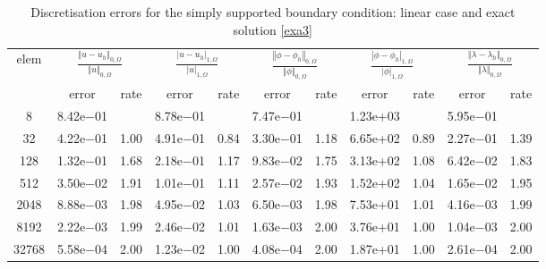\documentclass[a4paper,final]{siamltex}
\begin{document}
\begin{table}[htb!]
	\centering
	\caption{Discretisation errors  for the simply supported boundary condition: linear case and exact solution \eqref{exa3}}
	\begin{tabular}{|c|cc|cc|cc|cc|cc|}
		\hline
				\multirow{2}{*}{elem} & \multicolumn{2}{c|}{$\frac{\left\Vert u - u_h\right\Vert_{0,\Omega}}{\left\Vert u\right\Vert_{0,\Omega}}$} & \multicolumn{2}{c|}{$\frac{| u - u_h|_{1,\Omega}}{|u|_{1,\Omega}}$} & \multicolumn{2}{c|}{$\frac{\left\Vert \phi - \phi_h\right\Vert_{0,\Omega}}{\left\Vert \phi\right\Vert_{0,\Omega}}$} & \multicolumn{2}{c|}{$\frac{|\phi - \phi_h|_{1,\Omega}}{| \phi|_{1,\Omega}}$} & \multicolumn{2}{c|}{$\frac{\left\Vert \lambda - \lambda_h\right\Vert_{0,\Omega}}{\left\Vert \lambda\right\Vert_{0,\Omega}}$}\\ \hhline{~----------}
		& error & rate & error & rate & error & rate & error & rate & error & rate \\\hline
    8 & 8.42e$-$01 &  & 8.78e$-$01 &  & 7.47e$-$01 &  & 1.23e+03 &  & 5.95e$-$01 &  \\\hline
    32 & 4.22e$-$01 & 1.00 & 4.91e$-$01 & 0.84 & 3.30e$-$01 & 1.18 & 6.65e+02 & 0.89 & 2.27e$-$01 & 1.39 \\\hline
    128 & 1.32e$-$01 & 1.68 & 2.18e$-$01 & 1.17 & 9.83e$-$02 & 1.75 & 3.13e+02 & 1.08 & 6.42e$-$02 & 1.83 \\\hline
    512 & 3.50e$-$02 & 1.91 & 1.01e$-$01 & 1.11 & 2.57e$-$02 & 1.93 & 1.52e+02 & 1.04 & 1.65e$-$02 & 1.95 \\\hline
    2048 & 8.88e$-$03 & 1.98 & 4.95e$-$02 & 1.03 & 6.50e$-$03 & 1.98 & 7.53e+01 & 1.01 & 4.16e$-$03 & 1.99 \\\hline
    8192 & 2.22e$-$03 & 1.99 & 2.46e$-$02 & 1.01 & 1.63e$-$03 & 2.00 & 3.76e+01 & 1.00 & 1.04e$-$03 & 2.00 \\\hline
    32768 & 5.58e$-$04 & 2.00 & 1.23e$-$02 & 1.00 & 4.08e$-$04 & 2.00 & 1.87e+01 & 1.00 & 2.61e$-$04 & 2.00 \\\hline
	\end{tabular}
	\label{ss3:linear}
\end{table}
\end{document}
